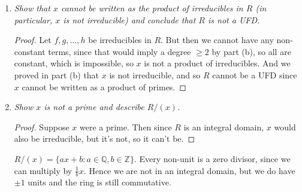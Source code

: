 \documentclass[10pt,oneside,reqno]{amsart}
\theoremstyle{plain}
\theoremstyle{definition}
\begin{document}
\begin{enumerate}
\begin{enumerate}
\begin{proof}
As noted above, $\mathbb{Q}[x]$ must be a PID, and thus we have that it is also a UFD, and so by Proposition 8.3.12, every irreducible element is also prime. Let $f(x) \in R$ be irreducible. We first consider the case where $f$ is constant. Then $f$ is an integer, and so since we already know the units are $\pm 1$ in $R$, exactly the primes in $\mathbb{Z}$ are irreducible in this case. Now suppose that $f(x)$ is a nonconstant polynomial, and let the constant term $a_0 \neq \pm 1$. If the constant terms is $0$, we can divide by $x$, which is not a unit, and in the case where $f(x) = \alpha x$, we know $\alpha x = \alpha\frac{1}{2}x$, and so $\alpha x$ is not irreducible. Then clearly we may divide by $|a_0|$, and since all the other coefficients are rationals, we have constructed some $g(x) \neq \pm 1$ s.t. $f(x) = |a_0|g(x)$, i.e. $f$ is the product of two non-units, hence reducible. Thus we must have that $a_0  = \pm 1$ if and only if $f$ is irreducible in this case. 
\end{proof}
\vspace{3mm}
\item \textit{Show that $x$ cannot be written as the product of irreducibles in $R$ (in particular, $x$ is not irreducible) and conclude that $R$ is not a UFD. }\\
\begin{proof}
Let $f,g,...,h$ be irreducibles in $R$. But then we cannot have any non-constant terms, since that would imply a degree $\geq 2$ by part (b), so all are constant, which is impossible, so $x$ is not a product of irreducibles. And we proved in part (b) that $x$ is not irreducible, and so $R$ cannot be a UFD since $x$ cannot be written as a product of primes. 
\end{proof}
\vspace{3mm}
\item \textit{Show $x$ is not a prime and describe $R/(x)$. }\\
\begin{proof}
Suppose $x$ were a prime. Then since $R$ is an integral domain, $x$ would also be irreducible, but it's not, so it can't be. 
\end{proof}

$R/(x) =\{ax + b:a \in \mathbb{Q}, b \in \mathbb{Z}\}$. Every non-unit is a zero divisor, since we can multiply by $\frac{1}{b}x$. Hence we are not in an integral domain, but we do have $\pm 1$ units and the ring is still commutative. 
\end{enumerate}


\end{enumerate}
\end{document}
